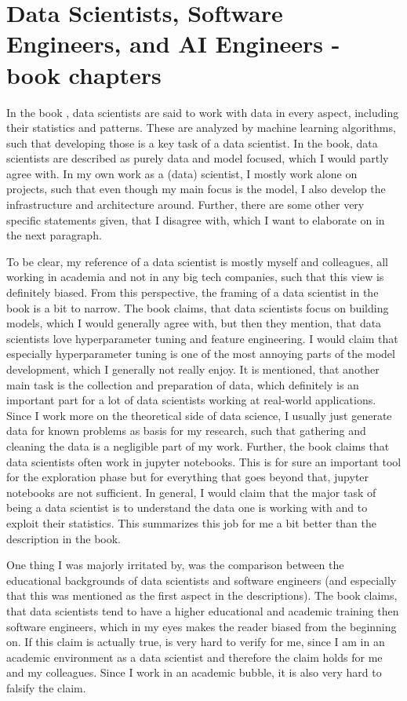 \documentclass[11pt]{article}
\begin{document}
\section{Data Scientists, Software Engineers, and AI Engineers - book chapters} \label{ch:book_chapter}
In the book \cite{Kastner2025Machine}, data scientists are said to work with data in every aspect, including their statistics and patterns. These are analyzed by machine learning algorithms, such that developing those is a key task of a data scientist. In the book, data scientists are described as purely data and model focused, which I would partly agree with. In my own work as a (data) scientist, I mostly work alone on projects, such that even though my main focus is the model, I also develop the infrastructure and architecture around. Further, there are some other very specific statements given, that I disagree with, which I want to elaborate on in the next paragraph. 

To be clear, my reference of a data scientist is mostly myself and colleagues, all working in academia and not in any big tech companies, such that this view is definitely biased. From this perspective, the framing of a data scientist in the book is a bit to narrow. The book claims, that data scientists focus on building models, which I would generally agree with, but then they mention, that data scientists love hyperparameter tuning and feature engineering. I would claim that especially hyperparameter tuning is one of the most annoying parts of the model development, which I generally not really enjoy. It is mentioned, that another main task is the collection and preparation of data, which definitely is an important part for a lot of data scientists working at real-world applications. Since I work more on the theoretical side of data science, I usually just generate data for known problems as basis for my research, such that gathering and cleaning the data is a negligible part of my work.
Further, the book claims that data scientists often work in jupyter notebooks. This is for sure an important tool for the exploration phase but for everything that goes beyond that, jupyter notebooks are not sufficient.
In general, I would claim that the major task of being a data scientist is to understand the data one is working with and to exploit their statistics. This summarizes this job for me a bit better than the description in the book. 

One thing I was majorly irritated by, was the comparison between the educational backgrounds of data scientists and software engineers (and especially that this was mentioned as the first aspect in the descriptions). The book claims, that data scientists tend to have a higher educational and academic training then software engineers, which in my eyes makes the reader biased from the beginning on. If this claim is actually true, is very hard to verify for me, since I am in an academic environment as a data scientist and therefore the claim holds for me and my colleagues. Since I work in an academic bubble, it is also very hard to falsify the claim.
\end{document}
